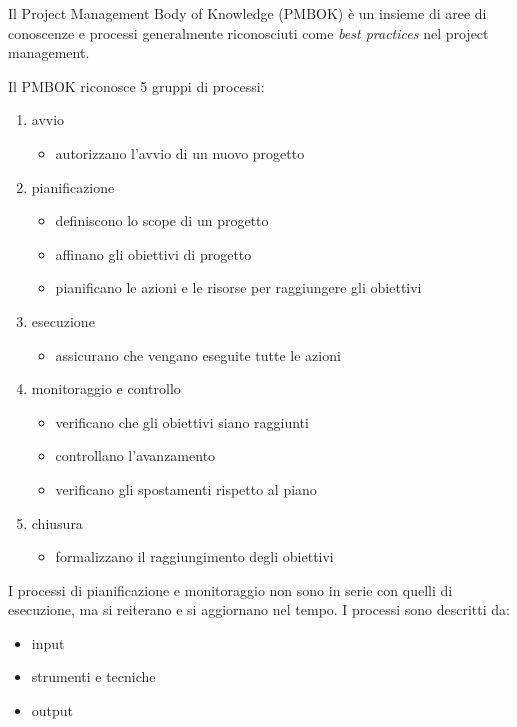 \documentclass[answers, a4paper, 11pt]{exam}
\begin{document}
Il Project Management Body of Knowledge (PMBOK) è un insieme di aree di conoscenze e processi generalmente riconosciuti come \emph{best practices} nel project management. 

Il PMBOK riconosce 5 gruppi di processi:

\begin{enumerate}
    \item avvio
    \begin{itemize}
        \item autorizzano l'avvio di un nuovo progetto
    \end{itemize}
    \item pianificazione
    \begin{itemize}
        \item definiscono lo scope di un progetto
        \item affinano gli obiettivi di progetto
        \item pianificano le azioni e le risorse per raggiungere gli obiettivi
    \end{itemize} 
    \item esecuzione
    \begin{itemize}
        \item assicurano che vengano eseguite tutte le azioni
    \end{itemize}
    \item monitoraggio e controllo
    \begin{itemize}
        \item verificano che gli obiettivi siano raggiunti
        \item controllano l'avanzamento
        \item verificano gli spostamenti rispetto al piano
    \end{itemize}
    \item chiusura
    \begin{itemize}
        \item formalizzano il raggiungimento degli obiettivi
    \end{itemize}
\end{enumerate}

I processi di pianificazione e monitoraggio non sono in serie con quelli di esecuzione, ma si reiterano e si aggiornano nel tempo. 
I processi sono descritti da:
\begin{itemize}
    \item input
    \item strumenti e tecniche
    \item output
\end{itemize}
\end{document}
